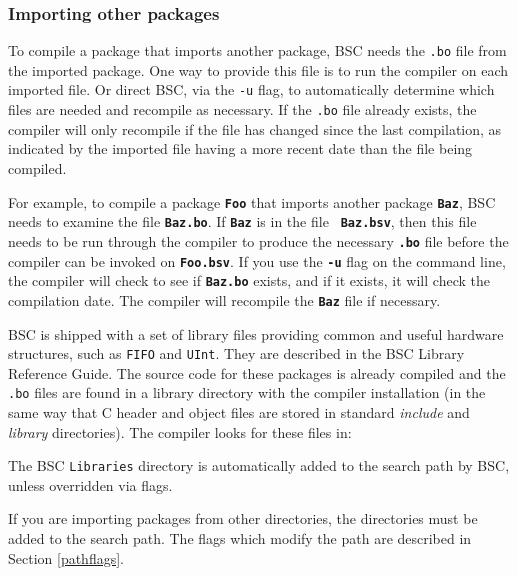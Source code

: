 \documentclass{article}
\newcommand{\te}[1]{\texttt{#1}}
\newenvironment{centerboxverbatim}
  {\center
   \boxedverbatim}
  {\endboxedverbatim
  {\endcenter }}
\begin{document}

\subsubsection{Importing other packages}
\label{sec-import-packages}

To compile a package that imports another package,
BSC needs the \te{.bo} file from the imported
package.  One way to provide this file is to run the compiler on
each imported file. Or direct BSC, via the \te{-u} flag, to
automatically determine which files are needed and recompile as
necessary.
If the \te{.bo} file already exists, the compiler will
only recompile if the file has changed since the last compilation, as indicated
by the imported file having a more recent date than the file being compiled.

For example, to compile  a package {\bf\tt Foo} that imports another package
{\bf\tt Baz}, BSC needs to examine the file {\bf\tt Baz.bo}. If {\bf\tt Baz} is in the file {\bf\tt
Baz.bsv},  then this file needs to be run
through the compiler to produce the necessary  {\bf\tt .bo}
file before the compiler can be invoked on {\bf\tt Foo.bsv}.
If you  use the {\bf\tt -u} flag on the command line,
the compiler will check to see if {\bf\tt Baz.bo} exists,
and if it exists, it will check the compilation date.
The compiler will recompile the {\bf\tt Baz} file if necessary.

BSC is shipped with a set of library files providing common
and useful hardware structures, such as
\te{FIFO} and \te{UInt}.  They are  described in the BSC Library
Reference Guide.   The source code for these packages is already
compiled and the  \te{.bo} files are
found in a library directory with the compiler installation (in
the same way that C header and object files are stored in standard
\emph{include} and \emph{library} directories). The compiler looks for
these files in:

\begin{centerboxverbatim}
\end{centerboxverbatim}
The BSC \te{Libraries} directory is automatically
added to the search path by BSC, unless overridden via flags.

If you are importing packages from other directories, the
directories must be added to the search path.  The flags
which modify the path are described in Section \ref{pathflags}.

\end{document}
